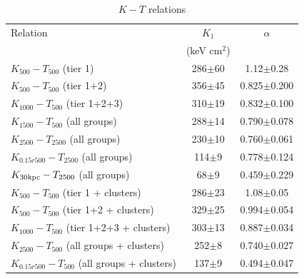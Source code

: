 \documentclass{aastex}
\begin{document}
\begin{table}
\begin{center}
\caption{$K - T$ relations}
\begin{tabular}{lcc} \hline \hline
Relation & $K_{1}$ & $\alpha$  \\
       & (keV cm$^{2}$) & \\ \hline

$K_{500} - T_{500}$ (tier 1) & 286$\pm$60 & 1.12$\pm$0.28 \\
$K_{500} - T_{500}$ (tier 1+2) & 356$\pm$45 & 0.825$\pm$0.200 \\
$K_{1000} - T_{500}$ (tier 1+2+3) & 310$\pm$19 & 0.832$\pm$0.100 \\
$K_{1500} - T_{500}$ (all groups) & 288$\pm$14 & 0.790$\pm$0.078 \\
$K_{2500} - T_{2500}$ (all groups) & 230$\pm$10 & 0.760$\pm$0.061 \\
$K_{0.15 r500} - T_{2500}$ (all groups) & 114$\pm$9 & 0.778$\pm$0.124 \\
$K_{30 \rm kpc} - T_{2500}$ (all groups) & 68$\pm$9 & 0.459$\pm$0.229 \\
\hline
$K_{500} - T_{500}$ (tier 1 + clusters) & 286$\pm$23 & 1.08$\pm$0.05 \\
$K_{500} - T_{500}$ (tier 1+2 + clusters) & 329$\pm$25 & 0.994$\pm$0.054 \\
$K_{1000} - T_{500}$ (tier 1+2+3 + clusters) & 303$\pm$13 & 0.887$\pm$0.034 \\
$K_{2500} - T_{500}$ (all groups + clusters) & 252$\pm$8 & 0.740$\pm$0.027 \\
$K_{0.15 r500} - T_{500}$ (all groups + clusters) & 137$\pm$9 & 0.494$\pm$0.047 \\

\hline \hline
\end{tabular}
\vspace{-1cm}
\end{center}
\end{table}
\end{document}
